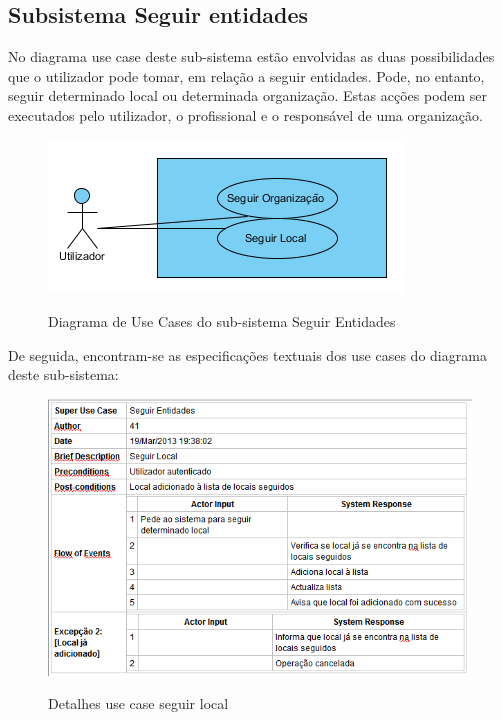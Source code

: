﻿\documentclass[12pt,a4paper]{article}
\begin{document}
\newpage
\subsection{Subsistema Seguir entidades}
No diagrama use case deste sub-sistema estão envolvidas as duas possibilidades que o utilizador pode tomar, em relação a seguir entidades. Pode, no entanto, seguir determinado local ou determinada organização. Estas acções podem ser executados pelo utilizador, o profissional e o responsável de uma organização.\\

\begin{figure}[h!]
\centering
\includegraphics[scale=1]{usecase/U_SeguirEntidades}
\label{usecase}
\caption{Diagrama de Use Cases do sub-sistema Seguir Entidades}
\end{figure}

De seguida, encontram-se as especificações textuais dos use cases do diagrama deste sub-sistema:\\


\begin{figure}[h!]
\centering
\includegraphics[scale=0.7]{d_usecase/seguirlocal}
\label{usecase}
\caption{Detalhes use case seguir local}
\end{figure}
\end{document}
